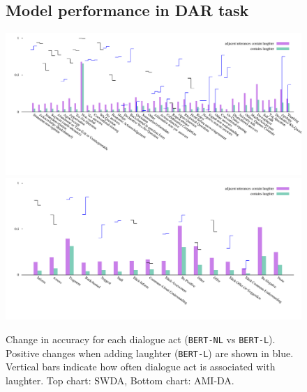 \documentclass[11pt,a4paper]{article}
\begin{document}
\begin{figure}[h!]
\subsection{Model performance in DAR task}
\label{sec:app:bert}

  \centering
  \includegraphics[width=\linewidth]{img/SWDA-bertLvsNL.pdf}
  \includegraphics[width=\linewidth]{img/AMI-DA-bertLvsNL.pdf}
  \caption{Change in accuracy for each dialogue act (\texttt{BERT-NL} vs \texttt{BERT-L}). Positive changes when adding laughter (\texttt{BERT-L}) are shown in blue. Vertical bars indicate how often dialogue act is associated with laughter. Top chart: SWDA, Bottom chart: AMI-DA. }
    \label{fig:by-da}
\end{figure}
\end{document}
